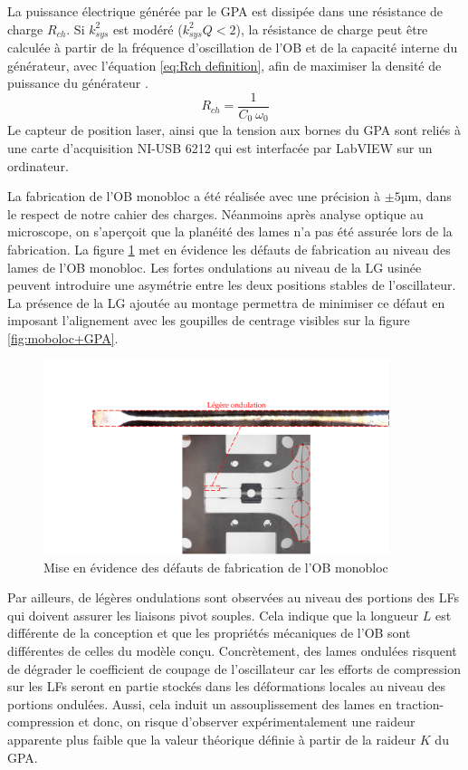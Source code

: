 La puissance électrique générée par le GPA est dissipée dans une résistance de charge $R_{ch}$. Si $k^2_{sys}$ est modéré ($k^2_{sys}Q<2$), la résistance de charge peut être calculée à partir de la fréquence d'oscillation de l'OB et de la capacité interne du générateur, avec l'équation \ref{eq:Rch definition}, afin de maximiser la densité de puissance du générateur \cite{Lefeuvre2005}.
\begin{equation}
	R_{ch} = \frac{1}{C_0\ \omega_0}
	\label{eq:Rch definition}
\end{equation}
Le capteur de position laser, ainsi que la tension aux bornes du GPA sont reliés à une carte d'acquisition NI-USB 6212 qui est interfacée par LabVIEW sur un ordinateur.

La fabrication de l'OB monobloc a été réalisée avec une précision à $\pm5$µm, dans le respect de notre cahier des charges. Néanmoins après analyse optique au microscope, on s'aperçoit que la planéité des lames n'a pas été assurée lors de la fabrication. La figure \ref{fig:BDT_defauts_OB} met en évidence les défauts de fabrication au niveau des lames de l'OB monobloc. Les fortes ondulations au niveau de la LG usinée peuvent introduire une asymétrie entre les deux positions stables de l'oscillateur. La présence de la LG ajoutée au montage permettra de minimiser ce défaut en imposant l'alignement avec les goupilles de centrage visibles sur la figure \ref{fig:moboloc+GPA}.
\begin{figure}[!htbp]
\begin{center}
    \captionsetup{justification=centering}
	\includegraphics[trim={4.5cm 0cm 0cm 4cm},clip, width=0.9\textwidth]{../Chap3/Figure/BDT_defauts_OB.pdf}
	\caption{Mise en évidence des défauts de fabrication de l'OB monobloc}
	\label{fig:BDT_defauts_OB}
\end{center}
\end{figure}
Par ailleurs, de légères ondulations sont observées au niveau des portions des LFs qui doivent assurer les liaisons pivot souples. Cela indique que la longueur $L$ est différente de la conception et que les propriétés mécaniques de l'OB sont différentes de celles du modèle conçu. Concrètement, des lames ondulées risquent de dégrader le coefficient de coupage de l'oscillateur car les efforts de compression sur les LFs seront en partie stockés dans les déformations locales au niveau des portions ondulées. Aussi, cela induit un assouplissement des lames en traction-compression et donc, on risque d'observer expérimentalement une raideur apparente plus faible que la valeur théorique définie à partir de la raideur $K$ du GPA.

